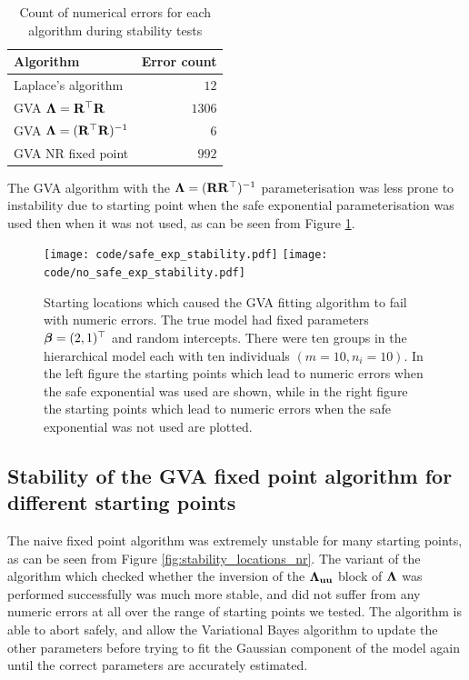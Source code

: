 \begin{table}
	\begin{tabular}{|l|r|}
		\hline
		Algorithm                            & Error count \\
		\hline
		Laplace's algorithm                  & $12$          \\
		GVA ${\boldsymbol \Lambda} = {\bf R}^\top {\bf R}$        & $1306$       \\
		GVA ${\boldsymbol \Lambda} = ({\bf R}^\top {\bf R})^{-1}$ & $6$           \\
		GVA NR fixed point                   & $992$         \\
		\hline
	\end{tabular}
	\caption{Count of numerical errors for each algorithm during stability tests}
	\label{tab:stability_results}
\end{table}

The GVA algorithm with the ${\boldsymbol \Lambda} = ({\bf R} {\bf R}^\top)^{-1}$ parameterisation
was less prone to instability due to starting point when the safe exponential
parameterisation was used then when it was not used, as can be seen from Figure
\ref{fig:stability_locations_gva}. %
		
\begin{figure}[h]
	\texttt{[image: code/safe\_exp\_stability.pdf]}
	\texttt{[image: code/no\_safe\_exp\_stability.pdf]}
	\label{fig:stability_locations_gva}
	\caption{Starting locations which caused the GVA fitting algorithm to fail with numeric errors. The true model had fixed parameters ${\boldsymbol \beta} = (2, 1)^\top$ and random intercepts. There were ten groups in the hierarchical model each	with ten individuals $(m=10, n_i=10)$. In the left figure the starting points which lead to numeric errors when the safe exponential was used are shown, while in the right figure the starting points which lead to numeric errors when the safe exponential was not used are plotted.}
\end{figure}

\subsection{Stability of the GVA fixed point algorithm for different starting
points} The naive fixed point algorithm was extremely unstable for many
starting points, as can be seen from Figure \ref{fig:stability_locations_nr}.
The variant of the algorithm which checked whether the inversion of the
${\boldsymbol \Lambda}_{{\bf u} {\bf u}}$ block of ${\boldsymbol \Lambda}$ was performed successfully was much
more stable, and did not suffer from any numeric errors at all over the range
of starting points we tested.  The algorithm is able to abort safely, and allow
the Variational Bayes algorithm to update the other parameters before trying to
fit the Gaussian component of the model again until the correct parameters are
accurately estimated.

